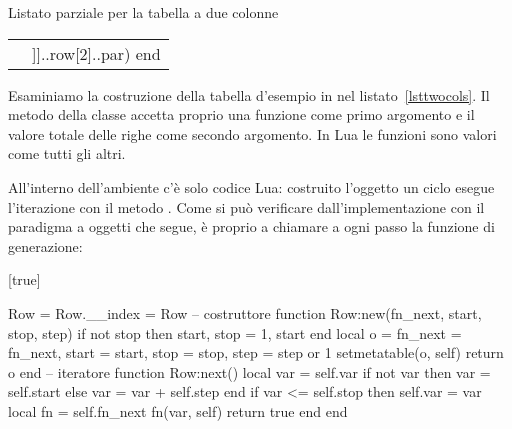 \begin{tcbfloat}[sidebyside,righthand width=21mm,label=lsttwocols]{%
    Listato parziale per la tabella a due colonne}
\tcblower
\begin{tabular}{rr}
\end{tabular}
\end{tcbfloat}

Esaminiamo la costruzione della tabella d'esempio in \LuaLaTeX{} nel
listato~\ref{lsttwocols}. Il metodo  della classe  accetta
proprio una funzione come primo argomento e il valore totale delle righe come
secondo argomento. In Lua le funzioni sono valori come tutti gli altri.

All'interno dell'ambiente  c'è solo codice Lua: costruito l'oggetto
 un ciclo  esegue l'iterazione con il metodo . Come
si può verificare dall'implementazione con il paradigma a oggetti che segue, è
proprio  a chiamare a ogni passo la funzione di generazione:

[true]
%
%
\begin{lines}
Row = {}
Row.__index = Row
-- costruttore
function Row:new(fn_next, start, stop, step)
    if not stop then
        start, stop = 1, start
    end
    local o = {
        fn_next = fn_next,
        start = start,
        stop = stop,
        step = step or 1
    }
    setmetatable(o, self)
    return o
end
-- iteratore
function Row:next()
    local var = self.var
    if not var then
        var = self.start
    else
        var = var + self.step
    end
    if var <= self.stop then
        self.var = var
        local fn = self.fn_next
        fn(var, self)
        return true
    end
end
\end{lines}

